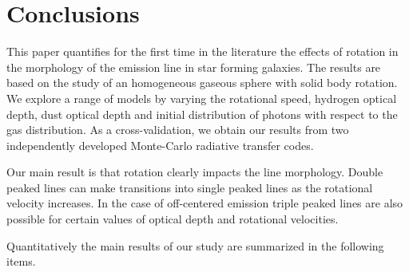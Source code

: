 \documentclass{emulateapj}
\newcommand{\ly}{{\ifmmode{{\rm Ly}\alpha~}\else{Ly$\alpha$~}\fi}}
\begin{document}
\section{Conclusions}
\label{sec:conclusions}

This paper quantifies for the first time in the literature the effects
of rotation in the morphology of the \ly emission line in star forming
galaxies.  The results are based on the study of an homogeneous
gaseous sphere with solid body rotation. We explore a range of models by varying
the rotational speed, hydrogen optical depth, dust optical depth and
initial distribution of \ly photons with respect to the gas
distribution. As a cross-validation, we obtain our results from two
independently developed Monte-Carlo radiative transfer codes.  

Our main result is that rotation clearly impacts the \ly line
morphology. Double peaked lines can make transitions into single
peaked lines as the rotational velocity increases. In the case of
off-centered emission triple peaked lines are also possible for
certain values of optical depth and rotational velocities.  

Quantitatively the main results of our study are summarized in the
following items.
\end{document}
